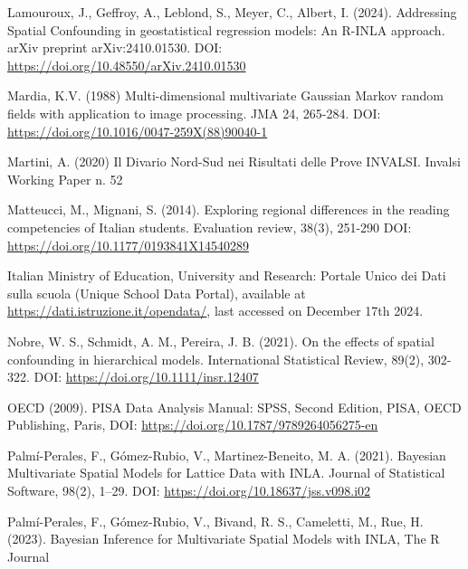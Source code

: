 \documentclass{article}
\begin{document}
\begin{thebibliography}{99}
Lamouroux, J., Geffroy, A., Leblond, S., Meyer, C.,  Albert, I. (2024). Addressing Spatial Confounding in geostatistical regression models: An R-INLA approach. arXiv preprint arXiv:2410.01530. DOI: \url{https://doi.org/10.48550/arXiv.2410.01530}

Mardia, K.V. (1988) Multi-dimensional multivariate Gaussian Markov random fields with application to image processing. JMA 24, 265-284. DOI: \url{https://doi.org/10.1016/0047-259X(88)90040-1}

Martini, A. (2020) Il Divario Nord-Sud nei Risultati delle Prove INVALSI. Invalsi Working Paper n. 52

Matteucci, M., Mignani, S. (2014). Exploring regional differences in the reading competencies of Italian students. Evaluation review, 38(3), 251-290 DOI: \url{https://doi.org/10.1177/0193841X14540289}


Italian Ministry of Education, University and Research: Portale Unico dei Dati sulla scuola (Unique School Data Portal), available at \url{https://dati.istruzione.it/opendata/}, last accessed on December 17th 2024.

Nobre, W. S., Schmidt, A. M., Pereira, J. B. (2021). On the effects of spatial confounding in hierarchical models. International Statistical Review, 89(2), 302-322. DOI: \url{https://doi.org/10.1111/insr.12407}

OECD (2009). PISA Data Analysis Manual: SPSS, Second Edition, PISA, OECD Publishing, Paris, DOI: \url{https://doi.org/10.1787/9789264056275-en}

Palmí-Perales, F., Gómez-Rubio, V.,  Martinez-Beneito, M. A. (2021). Bayesian Multivariate Spatial Models for Lattice Data with INLA. Journal of Statistical Software, 98(2), 1–29. DOI: \url{https://doi.org/10.18637/jss.v098.i02}

Palmí-Perales, F., Gómez-Rubio, V., Bivand, R. S., Cameletti, M., Rue, H. (2023). Bayesian Inference for Multivariate Spatial Models with INLA, The R Journal


\end{thebibliography}
\end{document}

